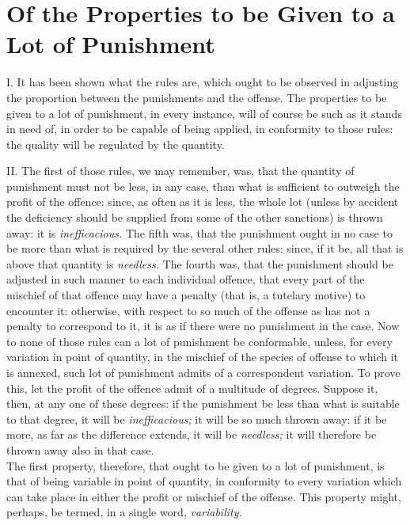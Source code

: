\documentclass[12pt]{report}
\begin{document}
\chapter{Of the Properties to be Given to a Lot of
Punishment}

I. It has been shown what the rules are, which ought to be observed in
adjusting the proportion between the punishments and the offense. The
properties to be given to a lot of punishment, in every instance, will
of course be such as it stands in need of, in order to be capable of
being applied, in conformity to those rules: the quality will be
regulated by the quantity.

II. The first of those rules, we may remember, was, that the quantity of
punishment must not be less, in any case, than what is sufficient to
outweigh the profit of the offence: since, as often as it is less, the
whole lot (unless by accident the deficiency should be supplied from
some of the other sanctions) is thrown away: it is \emph{inefficacious.}
The fifth was, that the punishment ought in no case to be more than what
is required by the several other rules: since, if it be, all that is
above that quantity is \emph{needless.} The fourth was, that the
punishment should be adjusted in such manner to each individual offence,
that every part of the mischief of that offence may have a penalty (that
is, a tutelary motive) to encounter it: otherwise, with respect to so
much of the offense as has not a penalty to correspond to it, it is as
if there were no punishment in the case. Now to none of those rules can
a lot of punishment be conformable, unless, for every variation in point
of quantity, in the mischief of the species of offense to which it is
annexed, such lot of punishment admits of a correspondent variation. To
prove this, let the profit of the offence admit of a multitude of
degrees. Suppose it, then, at any one of these degrees: if the
punishment be less than what is suitable to that degree, it will be
\emph{inefficacious;} it will be so much thrown away: if it be more, as
far as the difference extends, it will be \emph{needless;} it will
therefore be thrown away also in that case.\\
The first property, therefore, that ought to be given to a lot of
punishment, is that of being variable in point of quantity, in
conformity to every variation which can take place in either the profit
or mischief of the offense. This property might, perhaps, be termed, in
a single word, \emph{variability.}
\end{document}
